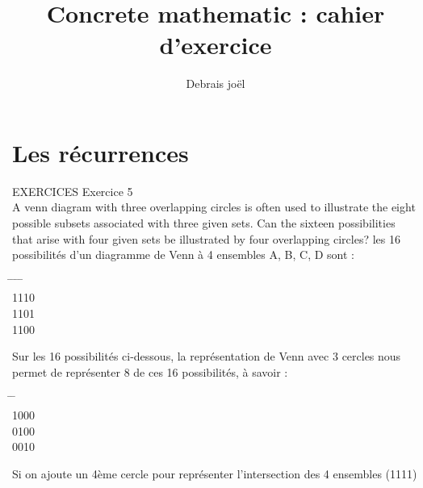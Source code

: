 \documentclass[9pt]{amsart}
\begin{document}
\title{Concrete mathematic : cahier d'exercice}
\author{Debrais joël}
\maketitle
\section{Les récurrences}
EXERCICES\newline\newline
Exercice 5\\
A venn diagram with three overlapping circles is often used to illustrate the eight possible subsets associated with three given sets. 
Can the sixteen possibilities that arise with four given sets be illustrated by four overlapping circles?
les 16 possibilités d'un diagramme de Venn à 4 ensembles A, B, C, D sont : 
\begin{tabbing}
\hspace{1.5cm} \= \hspace{1.5cm} \= \hspace{1.5cm} \= \hspace{1.5cm} \=     \\
1110    \\
1101    \\
1100   
\end{tabbing}
 Sur les 16 possibilités ci-dessous, la représentation de Venn avec 3 cercles nous permet de représenter 8 de ces 16 possibilités, à savoir : 
\begin{tabbing}
\hspace{1 cm} \= \hspace{1 cm}  \=   \\
1000  \\
0100  \\
0010 
\end{tabbing} 
Si on ajoute un 4ème cercle pour représenter l'intersection des 4 ensembles (1111)
\end{document}
